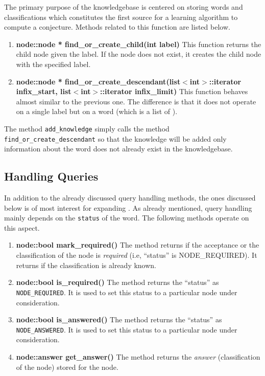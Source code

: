 The primary purpose of the knowledgebase is centered on storing words and classifications which constitutes the first source for a learning algorithm to compute a conjecture. Methods related to this function are listed below.
	
\begin{enumerate}
\item \textbf{node::node * find\_or\_create\_child(int label)} \vskip 1pt
	This function returns the child node given the label. If the node does not exist, it creates the child node with the specified label.
	
\item \textbf{node::node * find\_or\_create\_descendant(list$<$int$>$::iterator infix\_start, list$<$int$>$::iterator infix\_limit)} \hfill \vskip 1pt
	This function behaves almost similar to the previous one. The difference is that it does not operate on a single label but on a word (which is a list of \integer). 
\end{enumerate}	

 The method \texttt{add\_knowledge} simply calls the method \texttt{find\_or\_create\_descendant} so that the knowledge will be added only information about the word does not already exist in the knowledgebase.


\subsection*{Handling Queries}
In addition to the already discussed query handling methods, the ones discussed below is of most interest for expanding \libalf. 
As already mentioned, query handling mainly depends on the \texttt{status} of the word. The following methods operate on this aspect. 
\begin{enumerate}
\item \textbf{node::bool mark\_required()} \vskip 1pt
The method returns \true if the acceptance or the classification of the node is \emph{required} (i.e, ``status'' is NODE\_REQUIRED). It returns \false if the classification is already known.
	
\item \textbf{node::bool is\_required()} \vskip 1pt
The method returns the ``status'' as \texttt{NODE\_REQUIRED}. It is used to set this status to a particular node under consideration.

\item \textbf{node::bool is\_answered()} \vskip 1pt
The method returns the ``status'' as \texttt{NODE\_ANSWERED}. It is used to set this status to a particular node under consideration.
	
\item \textbf{node::answer get\_answer()} \vskip 1pt
The method returns the \emph{answer} (classification of the node) stored for the node. 
\end{enumerate}

